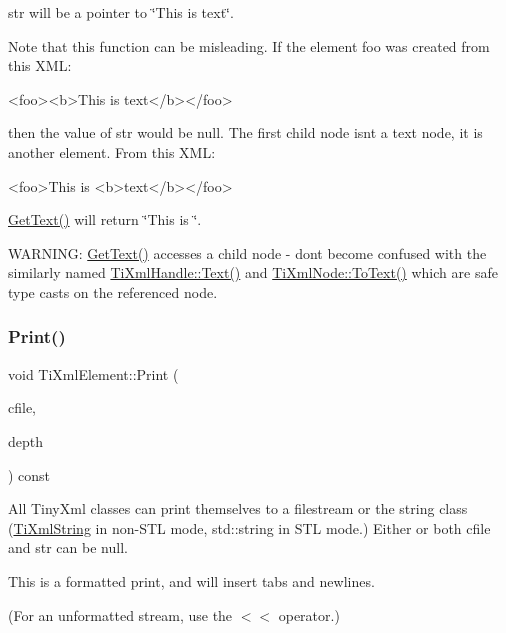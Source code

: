 \textquotesingle{}str\textquotesingle{} will be a pointer to \char`\"{}\+This is text\char`\"{}.

Note that this function can be misleading. If the element foo was created from this X\+ML\+: \begin{DoxyVerb}<foo><b>This is text</b></foo> 
\end{DoxyVerb}


then the value of str would be null. The first child node isn\textquotesingle{}t a text node, it is another element. From this X\+ML\+: \begin{DoxyVerb}<foo>This is <b>text</b></foo> 
\end{DoxyVerb}
 \hyperlink{class_ti_xml_element_af0f814ecbd43d50d4cdbdf4354d3da39}{Get\+Text()} will return \char`\"{}\+This is \char`\"{}.

W\+A\+R\+N\+I\+NG\+: \hyperlink{class_ti_xml_element_af0f814ecbd43d50d4cdbdf4354d3da39}{Get\+Text()} accesses a child node -\/ don\textquotesingle{}t become confused with the similarly named \hyperlink{class_ti_xml_handle_ad3b502c72059421e4dfcc7bda3c392fe}{Ti\+Xml\+Handle\+::\+Text()} and \hyperlink{class_ti_xml_node_a3ddfbcac78fbea041fad57e5c6d60a03}{Ti\+Xml\+Node\+::\+To\+Text()} which are safe type casts on the referenced node. \hypertarget{class_ti_xml_element_aa31a15cddfb8601a31236fe7d2569fb4}{}\label{class_ti_xml_element_aa31a15cddfb8601a31236fe7d2569fb4} 
\subsubsection{\texorpdfstring{Print()}{Print()}}
{\footnotesize\ttfamily void Ti\+Xml\+Element\+::\+Print (\begin{DoxyParamCaption}\item[{F\+I\+LE $\ast$}]{cfile,  }\item[{int}]{depth }\end{DoxyParamCaption}) const\hspace{0.3cm}{\ttfamily [virtual]}}

All Tiny\+Xml classes can print themselves to a filestream or the string class (\hyperlink{class_ti_xml_string}{Ti\+Xml\+String} in non-\/\+S\+TL mode, std\+::string in S\+TL mode.) Either or both cfile and str can be null.

This is a formatted print, and will insert tabs and newlines.

(For an unformatted stream, use the $<$$<$ operator.) 

